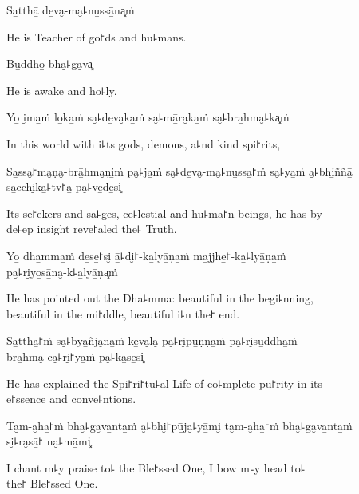 Sa̱tthā̱ de̱va̮-ma̮꜕nu̱ssā̱na͓ṁ

\begin{english}
  He is Teacher of go꜓ds and hu꜕mans.
\end{english}

Bu̱ddho̱ bha̮꜕ga̮vā͓

\begin{english}
  He is awake and ho꜕ly.
\end{english}

Yo̱ i̮ma̱ṁ lo̱ka̱ṁ sa̮꜕de̱va̮ka̱ṁ sa̮꜕mā̱ra̮ka̱ṁ sa̮꜕bra̱hma̮꜕ka͓ṁ

\begin{english}
  In this world with i꜕ts gods, demons, a꜕nd kind spi꜓rits,
\end{english}

Sa̱ssa̮꜓ma̮ṇa̮-brā̱hma̮ṇi̱ṁ pa̮꜕ja̱ṁ sa̮꜕de̱va̮-ma̮꜕nu̱ssa̱꜓ṁ sa̮꜕ya̱ṁ a̮꜕bhi̱ññā̱ sa̱cchi̮ka̱꜕tv꜓ā̱ pa̮꜕ve̱de̱si͓

\begin{english}
  Its se꜓ekers and sa꜕ges, ce꜕lestial and hu꜕ma꜓n beings, he has by \\de꜕ep insight reve꜓aled the꜕ Truth.
\end{english}

Yo̱ dha̱mma̱ṁ de̱se̱꜓si̮ ā̱꜕di̮꜓-ka̱lyā̱ṇa̱ṁ ma̱jjhe̱꜓-ka̱꜕lyā̱ṇa̱ṁ \\pa̮꜕ri̮yo̱sā̱na̮-k꜕a̱lyā̱ṇa͓ṁ

\begin{english}
  He has pointed out the Dha꜕mma: beautiful in the begi꜕nning, \\beautiful in the mi꜓ddle, beautiful i꜕n the꜓ end.
\end{english}

Sā̱ttha̱꜓ṁ sa̮꜕bya̱ñja̮na̱ṁ ke̱va̮la̮-pa̮꜕ri̮pu̱ṇṇa̱ṁ pa̮꜕ri̮su̱ddha̱ṁ \\bra̱hma̮-ca̮꜕ri̮꜓ya̱ṁ pa̮꜕kā̱se̱si͓

\begin{english}
  He has explained the Spi꜓ri꜓tu꜕al Life of co꜕mplete pu꜓rity in its \\e꜓ssence and conve꜕ntions.
\end{english}

Ta̮m-a̮ha̱꜓ṁ bha̮꜕ga̮va̱nta̱ṁ a̮꜕bhi̮꜓pū̱ja̮꜕yā̱mi̮ ta̮m-a̮ha̱꜓ṁ bha̮꜕ga̮va̱nta̱ṁ \\si̮꜕ra̮sā̱꜓ na̮꜕mā̱mi͓

\begin{english}
  I chant m꜕y praise to꜕ the Ble꜓ssed One, I bow m꜕y head to꜕ \\the꜓ Ble꜓ssed One.
\end{english}

